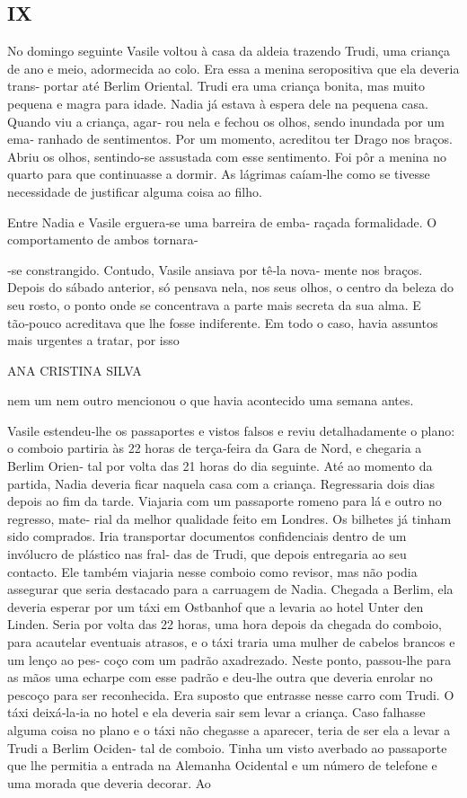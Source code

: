 \subsection{IX}

No domingo seguinte Vasile voltou à casa da aldeia trazendo Trudi, uma
criança de ano e meio, adormecida ao colo. Era essa a menina
seropositiva que ela deveria trans‑ portar até Berlim Oriental. Trudi
era uma criança bonita, mas muito pequena e magra para idade. Nadia já
estava à espera dele na pequena casa. Quando viu a criança, agar‑ rou
nela e fechou os olhos, sendo inundada por um ema‑ ranhado de
sentimentos. Por um momento, acreditou ter Drago nos braços. Abriu os
olhos, sentindo‑se assustada com esse sentimento. Foi pôr a menina no
quarto para que continuasse a dormir. As lágrimas caíam‑lhe como se
tivesse necessidade de justificar alguma coisa ao filho.

Entre Nadia e Vasile erguera‑se uma barreira de emba‑ raçada
formalidade. O comportamento de ambos tornara‑

‑se constrangido. Contudo, Vasile ansiava por tê‑la nova‑ mente nos
braços. Depois do sábado anterior, só pensava nela, nos seus olhos, o
centro da beleza do seu rosto, o ponto onde se concentrava a parte mais
secreta da sua alma. E tão‑pouco acreditava que lhe fosse indiferente.
Em todo o caso, havia assuntos mais urgentes a tratar, por isso

ANA CRISTINA SILVA

nem um nem outro mencionou o que havia acontecido uma semana antes.

Vasile estendeu‑lhe os passaportes e vistos falsos e reviu
detalhadamente o plano: o comboio partiria às 22 horas de terça‑feira da
Gara de Nord, e chegaria a Berlim Orien‑ tal por volta das 21 horas do
dia seguinte. Até ao momento da partida, Nadia deveria ficar naquela
casa com a criança. Regressaria dois dias depois ao fim da tarde.
Viajaria com um passaporte romeno para lá e outro no regresso, mate‑
rial da melhor qualidade feito em Londres. Os bilhetes já tinham sido
comprados. Iria transportar documentos confidenciais dentro de um
invólucro de plástico nas fral‑ das de Trudi, que depois entregaria ao
seu contacto. Ele também viajaria nesse comboio como revisor, mas não
podia assegurar que seria destacado para a carruagem de Nadia. Chegada a
Berlim, ela deveria esperar por um táxi em Ostbanhof que a levaria ao
hotel Unter den Linden. Seria por volta das 22 horas, uma hora depois da
chegada do comboio, para acautelar eventuais atrasos, e o táxi traria
uma mulher de cabelos brancos e um lenço ao pes‑ coço com um padrão
axadrezado. Neste ponto, passou‑lhe para as mãos uma echarpe com esse
padrão e deu‑lhe outra que deveria enrolar no pescoço para ser
reconhecida. Era suposto que entrasse nesse carro com Trudi. O táxi
deixá‑la‑ia no hotel e ela deveria sair sem levar a criança. Caso
falhasse alguma coisa no plano e o táxi não chegasse a aparecer, teria
de ser ela a levar a Trudi a Berlim Ociden‑ tal de comboio. Tinha um
visto averbado ao passaporte que lhe permitia a entrada na Alemanha
Ocidental e um número de telefone e uma morada que deveria decorar. Ao

